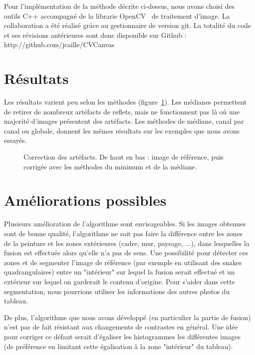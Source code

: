 \documentclass[12pt,a4paper]{article}
\begin{document}
Pour l'implémentation de la méthode décrite ci-dessus, nous avons choisi des outils C++ accompagné de la librarie OpenCV~\citep{opencv_library} de traitement d'image. La collaboration a été réalisé grâce au gestionnaire de version git. La totalité du code et ses révisions antérieures sont donc disponible sur Github : http://github.com/jcaille/CVCanvas

\section{Résultats}
Les résultats varient peu selon les méthodes (figure~\ref{mediane}). Les médianes permettent de retirer de nombreux artéfacts de reflets, mais ne fonctionnent pas là où une majorité d'images présentent des artéfacts. Les méthodes de médiane, canal par canal ou globale, donnent les mêmes résultats sur les exemples que nous avons essayés.
\begin{figure}
\centering
\begin{minipage}{0.6\linewidth}
\end{minipage}
\begin{minipage}{0.6\linewidth}
\end{minipage}
\begin{minipage}{0.6\linewidth}
\end{minipage}
\caption{Correction des artéfacts. De haut en bas : image de référence, puis corrigée avec les méthodes du minimum et de la médiane.}
\label{mediane}
\end{figure} 
\section{Améliorations possibles}

Plusieurs amélioration de l'algorithme sont envisageables. Si les images obtenues sont de bonne qualité, l'algorithme ne sait pas faire la différence entre les zones de la peinture et les zones extérieures (cadre, mur, paysage, ...), dans lesquelles la fusion est effectuée alors qu'elle n'a pas de sens. Une possibilité pour détecter ces zones et de segmenter l'image de référence (par exemple en utilisant des snakes quadrangulaires) entre un "intérieur" sur lequel la fusion serait effectué et un extérieur sur lequel on garderait le contenu d'origine. Pour s'aider dans cette segmentation, nous pourrions utiliser les informations des autres photos du tableau.

De plus, l'algorithme que nous avons développé (en particulier la partie de fusion) n'est pas de fait résistant aux changements de contrastes en général. Une idée pour corriger ce défaut serait d'égaliser les histogrammes les différentes images (de préférence en limitant cette égalisation à la zone "intérieur" du tableau).


\end{document}
